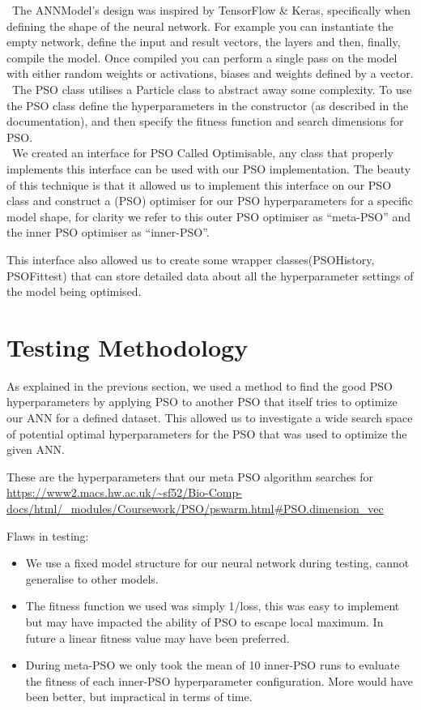 \documentclass[11pt]{article}
\begin{document}
\noindent~The ANNModel’s design was inspired by TensorFlow \& Keras\autocite{ModuleTfKeras,ModuleTfKeras,teamKerasDocumentationModel}, specifically when defining the shape of the neural network. For example you can instantiate the empty network, define the input and result vectors, the layers and then, finally, compile the model. 
Once compiled you can perform a single pass on the model with either random weights or activations, biases and weights defined by a vector.\\

\noindent~The PSO class utilises a Particle class to abstract away some complexity.
To use the PSO class define the hyperparameters in the constructor (as described in the documentation), and then specify the fitness function and search dimensions for PSO. \\

\noindent~We created an interface for PSO Called Optimisable, any class that properly implements this interface can be used with our PSO implementation. 
The beauty of this technique is that it allowed us to implement this interface on our PSO class and construct a (PSO) optimiser for our PSO hyperparameters for a specific model shape, for clarity we refer to this outer PSO optimiser as “meta-PSO” and the inner PSO optimiser as “inner-PSO”.

This interface also allowed us to create some wrapper classes(PSOHistory, PSOFittest) that can store detailed data about all the hyperparameter settings of the model being optimised.

\section{Testing Methodology}

As  explained in the previous section, we used a method to find the good PSO hyperparameters by applying PSO to another PSO that itself tries to optimize our ANN for a defined dataset.
This allowed us to investigate a wide search space of potential optimal hyperparameters for the PSO that was used to optimize the given ANN.

These are the hyperparameters that our meta PSO algorithm searches for \url{https://www2.macs.hw.ac.uk/~sf52/Bio-Comp-docs/html/_modules/Coursework/PSO/pswarm.html#PSO.dimension_vec}

Flaws in testing:
\begin{itemize}
    \item We use a fixed model structure for our neural network during testing, cannot generalise to other models.
    \item The fitness function we used was simply 1/loss, this was easy to implement but may have impacted the ability of PSO to escape local maximum. In future a linear fitness value may have been preferred.
    \item During meta-PSO we only took the mean of 10 inner-PSO runs to evaluate the fitness of each inner-PSO hyperparameter configuration. More would have been better, but impractical in terms of time.
\end{itemize}
\end{document}

